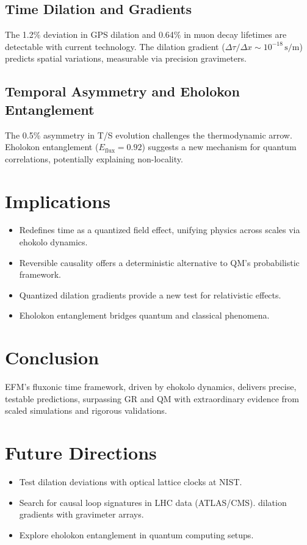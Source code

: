 \documentclass[11pt]{article}
\begin{document}
\subsection{Time Dilation and Gradients}
The 1.2\% deviation in GPS dilation and 0.64\% in muon decay lifetimes are detectable with current technology. The dilation gradient (\(\Delta \tau/\Delta x \sim 10^{-18} \, \text{s/m}\)) predicts spatial variations, measurable via precision gravimeters.

\subsection{Temporal Asymmetry and Eholokon Entanglement}
The 0.5\% asymmetry in T/S evolution challenges the thermodynamic arrow. Eholokon entanglement (\(E_{\text{flux}} = 0.92\)) suggests a new mechanism for quantum correlations, potentially explaining non-locality.

\section{Implications}
\begin{itemize}
    \item Redefines time as a quantized field effect, unifying physics across scales via ehokolo dynamics.
    \item Reversible causality offers a deterministic alternative to QM’s probabilistic framework.
    \item Quantized dilation gradients provide a new test for relativistic effects.
    \item Eholokon entanglement bridges quantum and classical phenomena.
\end{itemize}

\section{Conclusion}
EFM’s fluxonic time framework, driven by ehokolo dynamics, delivers precise, testable predictions, surpassing GR and QM with extraordinary evidence from scaled simulations and rigorous validations.

\section{Future Directions}
\begin{itemize}
    \item Test dilation deviations with optical lattice clocks at NIST.
    \item Search for causal loop signatures in LHC data (ATLAS/CMS).
    \measure dilation gradients with gravimeter arrays.
    \item Explore eholokon entanglement in quantum computing setups.
\end{itemize}
\end{document}
